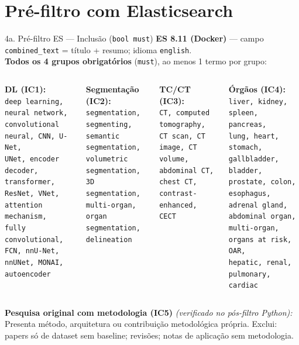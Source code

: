 \documentclass[aspectratio=169]{beamer}
\begin{document}
\section{Pré-filtro com Elasticsearch}
\begin{frame}{4a. Pré-filtro ES --- Inclusão (\texttt{bool must})}
\small
\textbf{ES 8.11 (Docker)} --- campo \texttt{combined\_text} = título + resumo; idioma \texttt{english}. \\
\textbf{Todos os 4 grupos obrigatórios} (\texttt{must}), ao menos 1 termo por grupo:

\begin{columns}[T]
\textbf{DL (IC1):}\\
\scriptsize\texttt{deep learning, neural network,\\convolutional neural, CNN, U-Net,\\UNet, encoder decoder, transformer,\\ResNet, VNet, attention mechanism,\\fully convolutional, FCN, nnU-Net,\\nnUNet, MONAI, autoencoder}

\smallskip
\textbf{Segmentação (IC2):}\\
\scriptsize\texttt{segmentation, segmenting,\\semantic segmentation,\\volumetric segmentation,\\3D segmentation, multi-organ,\\organ segmentation, delineation}

\textbf{TC/CT (IC3):}\\
\scriptsize\texttt{CT, computed tomography,\\CT scan, CT image, CT volume,\\abdominal CT, chest CT,\\contrast-enhanced, CECT}

\smallskip
\textbf{Órgãos (IC4):}\\
\scriptsize\texttt{liver, kidney, spleen, pancreas,\\lung, heart, stomach, gallbladder,\\bladder, prostate, colon, esophagus,\\adrenal gland, abdominal organ,\\multi-organ, organs at risk, OAR,\\hepatic, renal, pulmonary, cardiac}
\end{columns}

\smallskip\small
\textbf{Pesquisa original com metodologia (IC5)} \textit{(verificado no pós-filtro Python):}\\
\scriptsize
Presenta método, arquitetura ou contribuição metodológica própria.
Exclui: papers só de dataset sem baseline; revisões; notas de aplicação sem metodologia.
\end{frame}
\end{document}
